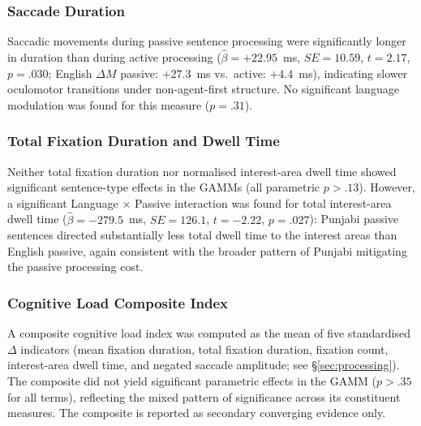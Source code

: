 \documentclass[12pt, a4paper]{article}
\begin{document}
\subsubsection{Saccade Duration}

Saccadic movements during passive sentence processing were significantly
longer in duration than during active processing
($\hat{\beta} = +22.95$~ms, $SE = 10.59$, $t = 2.17$, $p = .030$;
English $\Delta M$ passive: $+27.3$~ms vs.\ active: $+4.4$~ms),
indicating slower oculomotor transitions under non-agent-first structure.
No significant language modulation was found for this measure ($p = .31$).

\subsubsection{Total Fixation Duration and Dwell Time}

Neither total fixation duration nor normalised interest-area dwell time
showed significant sentence-type effects in the GAMMs (all parametric $p > .13$).
However, a significant Language $\times$ Passive interaction was found for
total interest-area dwell time ($\hat{\beta} = -279.5$~ms,
$SE = 126.1$, $t = -2.22$, $p = .027$): Punjabi passive sentences directed
substantially less total dwell time to the interest areas than English passive,
again consistent with the broader pattern of Punjabi mitigating the passive
processing cost.

\subsubsection{Cognitive Load Composite Index}

A composite cognitive load index was computed as the mean of five
standardised $\Delta$ indicators (mean fixation duration, total fixation
duration, fixation count, interest-area dwell time, and negated saccade
amplitude; see \S\ref{sec:processing}).
The composite did not yield significant parametric effects in the GAMM
($p > .35$ for all terms), reflecting the mixed pattern of significance
across its constituent measures.
The composite is reported as secondary converging evidence only.
\end{document}
